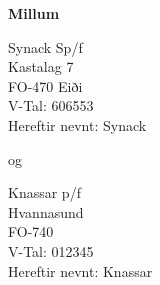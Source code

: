 



\def \overskrift    {}          %
\def \CompanyName   {Avtalað um Hýsing} %
\def \companyName   {\CompanyName}

\def \Kunden		{Knassar}
\def \KundenPf		{ p/f}
\def \KundenAddr	{Hvannasund}
\def \KundenPost	{FO-740}
\def \KundenVTAL	{012345}
\def \KundenKontakt	{Jón}
\def \KundenUnderskriftsLokation	{Hvannasund}

\def \SynackUnderskriftsLokation	{Hvannasund}
\def \SynackUnderskriver			{Ragnar Sigurðsson Joensen}


\vspace*{-38mm} \large
{}
\author{Heðin Ejdesgaard Møller}
\thispagestyle{HOSTJETTYFOOTER}
\vspace{25mm}
\begin{center}
	\textbf{Millum}
\end{center}
\begin{minipage}{0.32\textwidth}
	\begin{center}
	  	Synack Sp/f		\\
	  	Kastalag 7		\\
	  	FO-470 Eiði		\\
	  	V-Tal: 606553	\\ \vspace{3mm}
	  	Hereftir nevnt: Synack
	\end{center}
\end{minipage}
\begin{minipage}{0.32\textwidth}
	\begin{center}
		og
	\end{center}
\end{minipage}
\begin{minipage}{0.32\textwidth}
	\begin{center}
	   	\Kunden\KundenPf			\\
	   	\KundenAddr		\\
	   	\KundenPost		\\
	   	V-Tal: \KundenVTAL		\\ \vspace{3mm}
	   	Hereftir nevnt: \Kunden
	\end{center}
\end{minipage}

